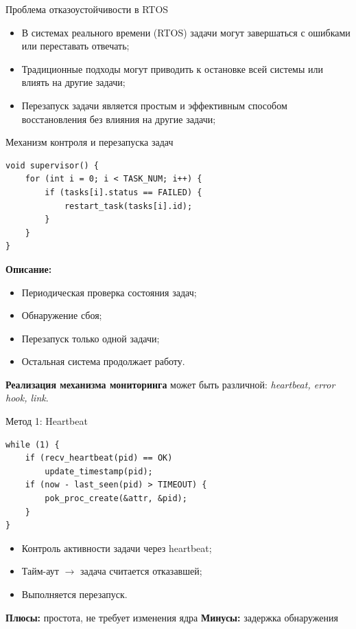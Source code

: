 \begin{frame}{Проблема отказоустойчивости в RTOS}
\begin{itemize}
    \item В системах реального времени (RTOS) задачи могут завершаться с ошибками или переставать отвечать;
    \item Традиционные подходы могут приводить к остановке всей системы или влиять на другие задачи;
    \item Перезапуск задачи является простым и эффективным способом восстановления без влияния на другие задачи;
\end{itemize}
\end{frame}

\begin{frame}[fragile]{Механизм контроля и перезапуска задач}
\begin{verbatim}
void supervisor() {
    for (int i = 0; i < TASK_NUM; i++) {
        if (tasks[i].status == FAILED) {
            restart_task(tasks[i].id);
        }
    }
}
\end{verbatim}

\vspace{0.5em}
\textbf{Описание:}
\begin{itemize}
    \item Периодическая проверка состояния задач;
    \item Обнаружение сбоя;
    \item Перезапуск только одной задачи;
    \item Остальная система продолжает работу.
\end{itemize}

\vspace{0.5em}
\textbf{Реализация механизма мониторинга} может быть различной:  
\textit{heartbeat, error hook, link}.
\end{frame}

\begin{frame}[fragile]{Метод 1: Heartbeat}
\begin{verbatim}
while (1) {
    if (recv_heartbeat(pid) == OK)
        update_timestamp(pid);
    if (now - last_seen(pid) > TIMEOUT) {
        pok_proc_create(&attr, &pid);
    }
}
\end{verbatim}

\vspace{0.5em}
\begin{itemize}
    \item Контроль активности задачи через heartbeat;
    \item Тайм-аут $\rightarrow$ задача считается отказавшей;
    \item Выполняется перезапуск.
\end{itemize}

\vspace{0.5em}
\textbf{Плюсы:} простота, не требует изменения ядра  
\textbf{Минусы:} задержка обнаружения
\end{frame}

